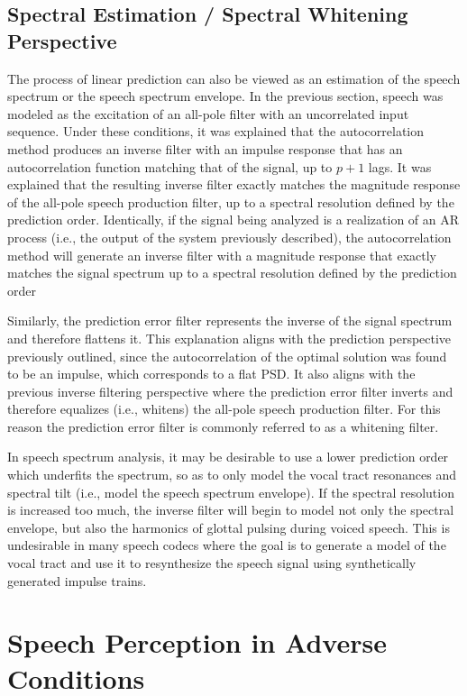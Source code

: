 \subsection{Spectral Estimation / Spectral Whitening Perspective}

The process of linear prediction can also be viewed as an estimation of the speech spectrum or the speech spectrum envelope. In the previous section, speech was modeled as the excitation of an all-pole filter with an uncorrelated input sequence. Under these conditions, it was explained that the autocorrelation method produces an inverse filter with an impulse response that has an autocorrelation function matching that of the signal, up to $p+1$ lags. It was explained that the resulting inverse filter exactly matches the magnitude response of the all-pole speech production filter, up to a spectral resolution defined by the prediction order. Identically, if the signal being analyzed is a realization of an AR process (i.e., the output of the system previously described), the autocorrelation method will generate an inverse filter with a magnitude response that exactly matches the signal  spectrum up to a spectral resolution defined by the prediction order

Similarly, the prediction error filter represents the inverse of the signal spectrum and therefore flattens it. This explanation aligns with the prediction perspective previously outlined, since the autocorrelation of the optimal solution was found to be an impulse, which corresponds to a flat PSD. It also aligns with the previous inverse filtering perspective where the prediction error filter inverts and therefore equalizes (i.e., whitens) the all-pole speech production filter. For this reason the prediction error filter is commonly referred to as a whitening filter. 

In speech spectrum analysis, it may be desirable to use a lower prediction order which underfits the spectrum, so as to only model the vocal tract resonances and spectral tilt (i.e., model the speech spectrum envelope). If the spectral resolution is increased too much, the inverse filter will begin to model not only the spectral envelope, but also the harmonics of glottal pulsing during voiced speech. This is undesirable in many speech codecs where the goal is to generate a model of the vocal tract and use it to resynthesize the speech signal using synthetically generated impulse trains.

\section{Speech Perception in Adverse Conditions}

